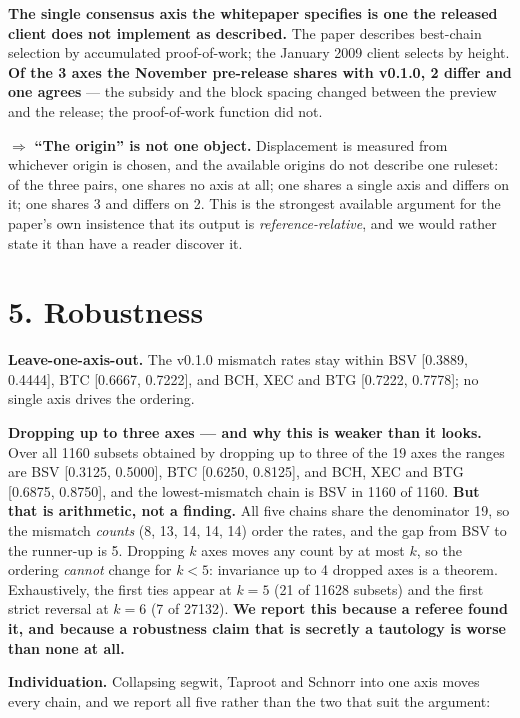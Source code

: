 \documentclass[
]{article}
\newcounter{none} %
\begin{document}
\textbf{The single consensus axis the whitepaper specifies is one the
released client does not implement as described.} The paper describes
best-chain selection by accumulated proof-of-work; the January 2009
client selects by height. \textbf{Of the 3 axes the November pre-release
shares with v0.1.0, 2 differ and one agrees} --- the subsidy and the
block spacing changed between the preview and the release; the
proof-of-work function did not.

\(\Rightarrow\) \textbf{``The origin'' is not one object.} Displacement
is measured from whichever origin is chosen, and the available origins
do not describe one ruleset: of the three pairs, one shares no axis at
all; one shares a single axis and differs on it; one shares 3 and
differs on 2. This is the strongest available argument for the paper's
own insistence that its output is \emph{reference-relative}, and we
would rather state it than have a reader discover it.

\section{5. Robustness}\label{robustness}

\textbf{Leave-one-axis-out.} The v0.1.0 mismatch rates stay within BSV
{[}0.3889, 0.4444{]}, BTC {[}0.6667, 0.7222{]}, and BCH, XEC and BTG
{[}0.7222, 0.7778{]}; no single axis drives the ordering.

\textbf{Dropping up to three axes --- and why this is weaker than it
looks.} Over all 1160 subsets obtained by dropping up to three of the 19
axes the ranges are BSV {[}0.3125, 0.5000{]}, BTC {[}0.6250, 0.8125{]},
and BCH, XEC and BTG {[}0.6875, 0.8750{]}, and the lowest-mismatch chain
is BSV in 1160 of 1160. \textbf{But that is arithmetic, not a finding.}
All five chains share the denominator 19, so the mismatch \emph{counts}
(8, 13, 14, 14, 14) order the rates, and the gap from BSV to the
runner-up is 5. Dropping \(k\) axes moves any count by at most \(k\), so
the ordering \emph{cannot} change for \(k<5\): invariance up to 4
dropped axes is a theorem. Exhaustively, the first ties appear at
\(k=5\) (21 of 11628 subsets) and the first strict reversal at \(k=6\)
(7 of 27132). \textbf{We report this because a referee found it, and
because a robustness claim that is secretly a tautology is worse than
none at all.}

\textbf{Individuation.} Collapsing segwit, Taproot and Schnorr into one
axis moves every chain, and we report all five rather than the two that
suit the argument:
\end{document}
